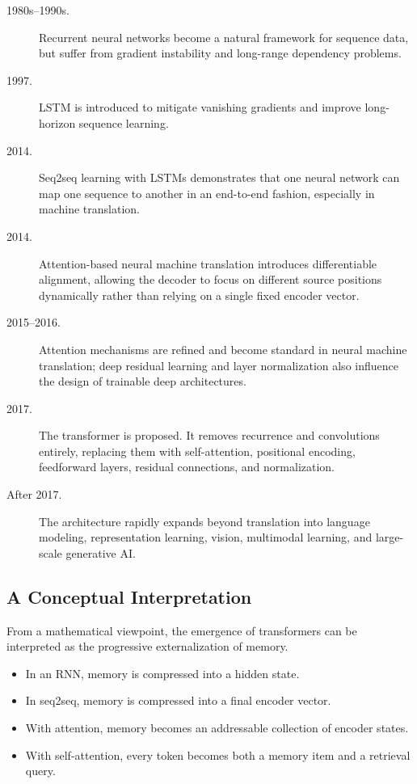 \begin{description}
    \item[1980s--1990s.] Recurrent neural networks become a natural framework for sequence data, but suffer from gradient instability and long-range dependency problems.
    
    \item[1997.] LSTM is introduced to mitigate vanishing gradients and improve long-horizon sequence learning.
    
    \item[2014.] Seq2seq learning with LSTMs demonstrates that one neural network can map one sequence to another in an end-to-end fashion, especially in machine translation.
    
    \item[2014.] Attention-based neural machine translation introduces differentiable alignment, allowing the decoder to focus on different source positions dynamically rather than relying on a single fixed encoder vector.
    
    \item[2015--2016.] Attention mechanisms are refined and become standard in neural machine translation; deep residual learning and layer normalization also influence the design of trainable deep architectures.
    
    \item[2017.] The transformer is proposed. It removes recurrence and convolutions entirely, replacing them with self-attention, positional encoding, feedforward layers, residual connections, and normalization.
    
    \item[After 2017.] The architecture rapidly expands beyond translation into language modeling, representation learning, vision, multimodal learning, and large-scale generative AI.
\end{description}

\subsection{A Conceptual Interpretation}

From a mathematical viewpoint, the emergence of transformers can be interpreted as the progressive externalization of memory.

\begin{itemize}
    \item In an RNN, memory is compressed into a hidden state.
    \item In seq2seq, memory is compressed into a final encoder vector.
    \item With attention, memory becomes an addressable collection of encoder states.
    \item With self-attention, every token becomes both a memory item and a retrieval query.
\end{itemize}

